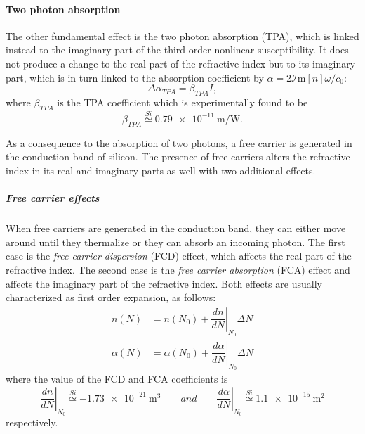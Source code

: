 \paragraph{Two photon absorption}
The other fundamental effect is the two photon absorption (TPA), which is linked instead to the imaginary part of the third order nonlinear susceptibility.
It does not produce a change to the real part of the refractive index but to its imaginary part, which is in turn linked to the absorption coefficient by $\alpha=2\mathcal{I}\mathrm{m}[n]\omega/c_0$:
\begin{equation}
	\Delta\alpha_{TPA} = \beta_{TPA} I,
\end{equation}
where $\beta_{TPA}$ is the TPA coefficient which is experimentally found to be
\begin{equation}
	\beta_{TPA} \overset{Si}{\simeq} \SI{0.79e-11}{\m\per\W}.
\end{equation}

As a consequence to the absorption of two photons, a free carrier is generated in the conduction band of silicon.
The presence of free carriers alters the refractive index in its real and imaginary parts as well with  two additional effects.

\subparagraph{Free carrier effects}
When free carriers are generated in the conduction band, they can either move around until they thermalize or they can absorb an incoming photon.
The first case is the \textit{free carrier dispersion} (FCD) effect, which affects the real part of the refractive index.
The second case is the \textit{free carrier absorption} (FCA) effect and affects the imaginary part of the refractive index.
Both effects are usually characterized as first order expansion, as follows:
\begin{align}
	n			\left(N	\right) &= n				\left(N_0\right) + \left.\dfrac{dn}{dN}\right|_{N_0} \Delta N \\
	\alpha	\left(N	\right) &= \alpha	\left(N_0\right) + \left.\dfrac{d\alpha}{dN}\right|_{N_0} \Delta N
\end{align}
where the value of the FCD and FCA coefficients is
\begin{equation}
	\left.\dfrac{dn}{dN}\right|_{N_0} \overset{Si}{\simeq} \SI{-1.73e-21}{\cubic\m}
	\qquad and \qquad
	\left.\dfrac{d\alpha}{dN}\right|_{N_0} \overset{Si}{\simeq} \SI{1.1e-15}{\square\m}
\end{equation}
respectively.

